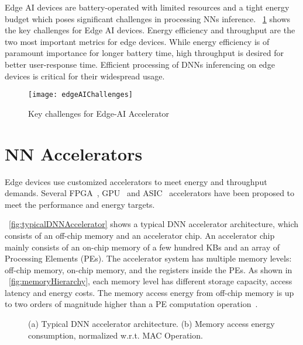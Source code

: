 Edge AI devices are battery-operated with limited resources and a tight energy budget which poses significant challenges in processing NNs inference. \figurename{~\ref{fig:edgeAIChallenges}} shows the key challenges for Edge AI devices. Energy efficiency and throughput are the two most important metrics for edge devices. While energy efficiency is of paramount importance for longer battery time, high throughput is desired for better user-response time. Efficient processing of DNNs inferencing on edge devices is critical for their widespread usage. 
\begin{figure}[!htb]
	\centering
	\captionsetup{font=sf}
	\texttt{[image: edgeAIChallenges]}
	\caption{Key challenges for Edge-AI Accelerator}
	\label{fig:edgeAIChallenges}
\end{figure}
\section{NN Accelerators}
Edge devices use customized accelerators to meet energy and throughput demands. Several FPGA~\cite{zhang2015optimizing,wei2019overcoming,gokhale2014240,8742284,gupta2015deep,alwani2016fused}, GPU~\cite{chetlur2014cudnn} and ASIC~\cite{Chen2016EyerissAS,chen2014diannao,chen2014dadiannao,du2015shidiannao} accelerators have been proposed to meet the performance and energy targets. 

\figurename{~\ref{fig:typicalDNNAccelerator}} shows a typical DNN accelerator architecture, which consists of an off-chip memory and an accelerator chip. An accelerator chip mainly consists of an on-chip memory of a few hundred KBs and an array of Processing Elements (PEs). The accelerator system has multiple memory levels: off-chip memory, on-chip memory, and the registers inside the PEs. As shown in \figurename{~\ref{fig:memoryHierarchy}}, each memory level has different storage capacity, access latency and energy costs. The memory access energy from off-chip memory is up to two orders of magnitude higher than a PE computation operation~\cite{Chen2016EyerissAS}. 
\begin{figure}[!htb]
	\centering
	\captionsetup{font=sf}
	\hfil
	\caption{(a) Typical DNN accelerator architecture. (b) Memory access energy consumption, normalized w.r.t. MAC Operation.}
	\label{fig:acceleratorAndRoofline}
\end{figure}

